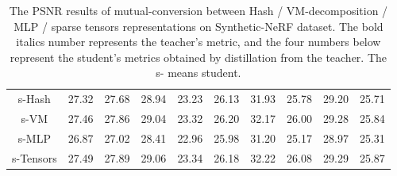 \documentclass[letterpaper]{article} \usepackage{aaai23}  \usepackage{times}  \usepackage{helvet}  \usepackage{courier}  \usepackage[hyphens]{url}  \usepackage{graphicx} \urlstyle{rm} \def\UrlFont{\rm}  \usepackage{natbib}  \usepackage{caption} \frenchspacing  \setlength{\pdfpagewidth}{8.5in}  \setlength{\pdfpageheight}{11in}  \usepackage{multirow}
\begin{document}
\begin{table*}[t]
{\begin{tabular}{c|ccccccccc}
s-Hash                      & 27.32                   & 27.68                   & 28.94                   & 23.23                   & 26.13                   & 31.93                   & 25.78                   & 29.20                   & 25.71                   \\
s-VM                        & 27.46                   & 27.86                   & 29.04                   & 23.32                   & 26.20                   & 32.17                   & 26.00                   & 29.28                   & 25.84                   \\
s-MLP                       & 26.87                   & 27.02                   & 28.41                   & 22.96                   & 25.98                   & 31.20                   & 25.17                   & 28.97                   & 25.31                   \\
s-Tensors                   & 27.49                   & 27.89                   & 29.06                   & 23.34                   & 26.18                   & 32.22                   & 26.08                   & 29.29                   & 25.87                   \\ \hline
\end{tabular}
}
\caption{ The PSNR results of mutual-conversion between Hash / VM-decomposition / MLP /
sparse tensors representations on Synthetic-NeRF dataset. The bold italics number represents the teacher's metric, and the four numbers below represent the student's metrics obtained by distillation from the teacher. The s- means student.}
\label{tab-psnr-mutual-syn}
\end{table*}
\end{document}
